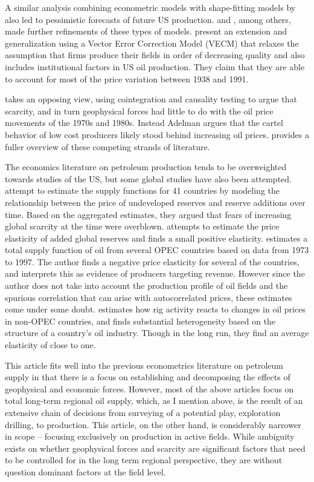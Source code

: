 \documentclass[12pt]{article}
\begin{document}
A similar analysis combining econometric models with shape-fitting models by \citet{cleveland_forecasting_1991} also led to pessimistic forecasts of future US production. \citet{pesaran_forecasting_1995} and \citet{moroney_integrated_1999}, among others, made further refinements of these types of models. \citet{kaufmann_oil_2001} present an extension and generalization using a Vector Error Correction Model (VECM) that relaxes the assumption that firms produce their fields in order of decreasing quality and also includes institutional factors in US oil production. They claim that they are able to account for most of the price variation between 1938 and 1991.

\citet{adelman_mineral_1990, adelman_modelling_1993} takes an opposing view, using cointegration and causality testing to argue that scarcity, and in turn geophysical forces had little to do with the oil price movements of the 1970s and 1980s. Instead Adelman argues that the cartel behavior of low cost producers likely stood behind increasing oil prices. \citet{lynch_forecasting_2002} provides a fuller overview of these competing strands of literature. 

The economics literature on petroleum production tends to be overweighted towards studies of the US, but some global studies have also been attempted. \citet{watkins_world_1998} attempt to estimate the supply functions for 41 countries by modeling the relationship between the price of undeveloped reserves and reserve additions over time. Based on the aggregated estimates, they argued that fears of increasing global scarcity at the time were overblown. \citet{farzin_impact_2001} attempts to estimate the price elasticity of added global reserves and finds a small positive elasticity.  \citet{ramcharran_oil_2002} estimates a total supply function of oil from several OPEC countries based on data from 1973 to 1997.  The author finds a negative price elasticity for several of the countries, and interprets this as evidence of producers targeting revenue.  However since the author does not take into account the production profile of oil fields and the spurious correlation that can arise with autocorrelated prices, these estimates come under some doubt. \citet{ringlund_does_2008} estimates how rig activity reacts to changes in oil prices in non-OPEC countries, and finds substantial heterogeneity based on the structure of a country's oil industry. Though in the long run, they find an average elasticity of close to one. 

This article fits well into the previous econometrics literature on petroleum supply in that there is a focus on establishing and decomposing the effects of geophysical and economic forces. However, most of the above articles focus on total long-term regional oil supply, which, as I mention above, is the result of an extensive chain of decisions from surveying of a potential play, exploration drilling, to production. This article, on the other hand, is considerably narrower in scope -- focusing exclusively on production in active fields. While ambiguity exists on whether geophysical forces and scarcity are significant factors that need to be controlled for in the long term regional perspective, they are without question dominant factors at the field level.
\end{document}
